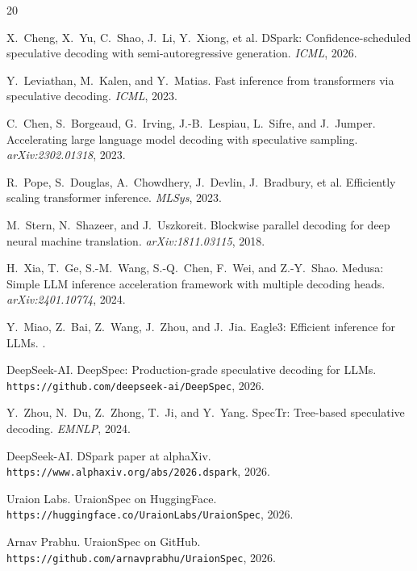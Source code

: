 \documentclass[11pt,a4paper]{article}
\begin{document}

\begin{thebibliography}{20}

X.~Cheng, X.~Yu, C.~Shao, J.~Li, Y.~Xiong, et al.
\newblock DSpark: Confidence-scheduled speculative decoding with
semi-autoregressive generation.
\newblock \textit{ICML}, 2026.

Y.~Leviathan, M.~Kalen, and Y.~Matias.
\newblock Fast inference from transformers via speculative decoding.
\newblock \textit{ICML}, 2023.

C.~Chen, S.~Borgeaud, G.~Irving, J.-B.~Lespiau, L.~Sifre, and
J.~Jumper.
\newblock Accelerating large language model decoding with speculative
sampling.
\newblock \textit{arXiv:2302.01318}, 2023.

R.~Pope, S.~Douglas, A.~Chowdhery, J.~Devlin, J.~Bradbury, et al.
\newblock Efficiently scaling transformer inference.
\newblock \textit{MLSys}, 2023.

M.~Stern, N.~Shazeer, and J.~Uszkoreit.
\newblock Blockwise parallel decoding for deep neural machine translation.
\newblock \textit{arXiv:1811.03115}, 2018.

H.~Xia, T.~Ge, S.-M.~Wang, S.-Q.~Chen, F.~Wei, and Z.-Y.~Shao.
\newblock Medusa: Simple LLM inference acceleration framework with multiple
decoding heads.
\newblock \textit{arXiv:2401.10774}, 2024.

Y.~Miao, Z.~Bai, Z.~Wang, J.~Zhou, and J.~Jia.
\newblock Eagle3: Efficient inference for LLMs.
.

DeepSeek-AI.
\newblock DeepSpec: Production-grade speculative decoding for LLMs.
\newblock \texttt{https://github.com/deepseek-ai/DeepSpec}, 2026.

Y.~Zhou, N.~Du, Z.~Zhong, T.~Ji, and Y.~Yang.
\newblock SpecTr: Tree-based speculative decoding.
\newblock \textit{EMNLP}, 2024.

DeepSeek-AI.
\newblock DSpark paper at alphaXiv.
\newblock \texttt{https://www.alphaxiv.org/abs/2026.dspark}, 2026.

Uraion Labs.
\newblock UraionSpec on HuggingFace.
\newblock \texttt{https://huggingface.co/UraionLabs/UraionSpec}, 2026.

Arnav Prabhu.
\newblock UraionSpec on GitHub.
\newblock \texttt{https://github.com/arnavprabhu/UraionSpec}, 2026.

\end{thebibliography}
\end{document}
